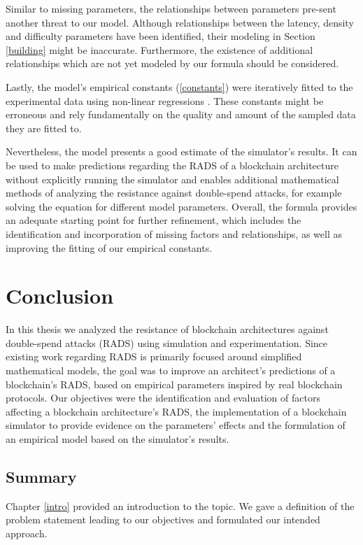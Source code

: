 \documentclass[a4paper,12pt,twoside]{report}
\begin{document}
Similar to missing parameters, the relationships between parameters pre-sent another threat to our model. Although relationships between the latency, density and difficulty parameters have been identified, their modeling in Section \ref{building} might be inaccurate. Furthermore, the existence of additional relationships which are not yet modeled by our formula should be considered. 

Lastly, the model's empirical constants (\autoref{constants}) were iteratively fitted to the experimental data using non-linear regressions \cite{nlxb}. These constants might be erroneous and rely fundamentally on the quality and amount of the sampled data they are fitted to.

Nevertheless, the model presents a good estimate of the simulator's results. It can be used to make predictions regarding the RADS of a blockchain architecture without explicitly running the simulator and enables additional mathematical methods of analyzing the resistance against double-spend attacks, for example solving the equation for different model parameters. Overall, the formula provides an adequate starting point for further refinement, which includes the identification and incorporation of missing factors and relationships, as well as improving the fitting of our empirical constants.

\chapter{Conclusion} \label{conclusion}
\begin{sloppypar} In this thesis we analyzed the resistance of blockchain architectures against double-spend attacks (RADS) using simulation and experimentation. Since existing work regarding RADS is primarily focused around simplified mathematical models, the goal was to improve an architect's predictions of a blockchain's RADS, based on empirical parameters inspired by real blockchain protocols. Our objectives were the identification and evaluation of factors affecting a blockchain architecture's RADS, the implementation of a blockchain simulator to provide evidence on the parameters' effects and the formulation of an empirical model based on the simulator's results. \end{sloppypar}
\section{Summary}
Chapter \ref{intro} provided an introduction to the topic. We gave a definition of the problem statement leading to our objectives and formulated our intended approach. 
\end{document}
